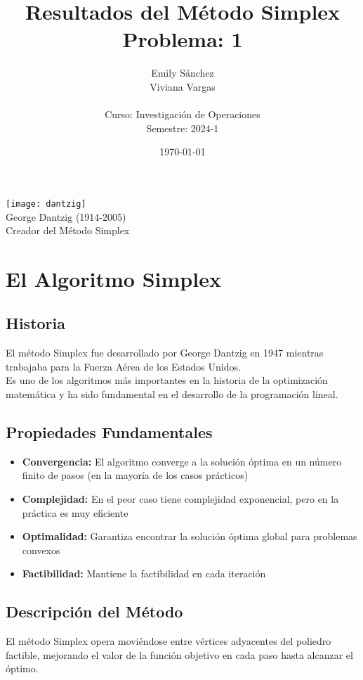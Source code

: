 \documentclass[12pt]{article}
\title{Resultados del Método Simplex\\
\large Problema: \textbf{1}}
\author{
Emily Sánchez\\
Viviana Vargas\\
\\
Curso: Investigación de Operaciones\\
Semestre: 2024-1
}
\date{\today}
\begin{document}
\maketitle
\thispagestyle{empty}

\vfill
\begin{center}
\texttt{[image: dantzig]}
\\
\small George Dantzig (1914-2005)
\\
Creador del Método Simplex
\end{center}
\vfill

\newpage
\tableofcontents
\newpage
\section{El Algoritmo Simplex}

\subsection{Historia}
El método Simplex fue desarrollado por George Dantzig en 1947 mientras trabajaba para la Fuerza Aérea de los Estados Unidos. \\

Es uno de los algoritmos más importantes en la historia de la optimización matemática y ha sido fundamental en el desarrollo de la programación lineal.

\subsection{Propiedades Fundamentales}
\begin{itemize}
\item \textbf{Convergencia:} El algoritmo converge a la solución óptima en un número finito de pasos (en la mayoría de los casos prácticos)
\item \textbf{Complejidad:} En el peor caso tiene complejidad exponencial, pero en la práctica es muy eficiente
\item \textbf{Optimalidad:} Garantiza encontrar la solución óptima global para problemas convexos
\item \textbf{Factibilidad:} Mantiene la factibilidad en cada iteración
\end{itemize}

\subsection{Descripción del Método}
El método Simplex opera moviéndose entre vértices adyacentes del poliedro factible, mejorando el valor de la función objetivo en cada paso hasta alcanzar el óptimo.
\end{document}
